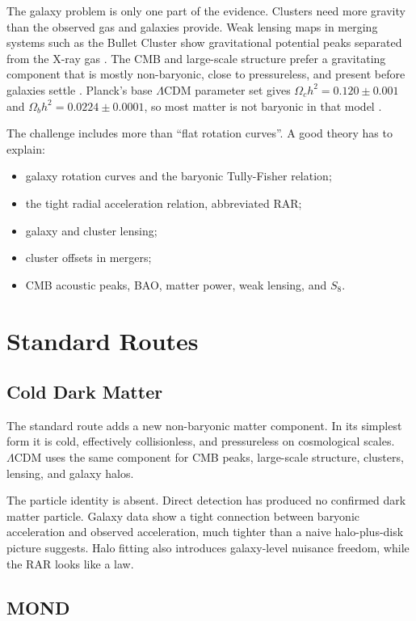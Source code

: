 \documentclass[11pt]{article}
\newcommand{\LCDM}{\Lambda\mathrm{CDM}}
\begin{document}
The galaxy problem is only one part of the evidence.  Clusters need more
gravity than the observed gas and galaxies provide.  Weak lensing maps in
merging systems such as the Bullet Cluster show gravitational potential peaks
separated from the X-ray gas \cite{clowe2006}.  The CMB and large-scale
structure prefer a gravitating component that is mostly non-baryonic, close to
pressureless, and present before galaxies settle \cite{planck2018}.  Planck's
base \(\LCDM\) parameter set gives
\(\Omega_c h^2=0.120\pm0.001\) and
\(\Omega_b h^2=0.0224\pm0.0001\), so most matter is not baryonic in that
model \cite{planck2018}.

The challenge includes more than ``flat rotation curves''.  A good theory has
to explain:
\begin{itemize}
\item galaxy rotation curves and the baryonic Tully-Fisher relation;
\item the tight radial acceleration relation, abbreviated RAR;
\item galaxy and cluster lensing;
\item cluster offsets in mergers;
\item CMB acoustic peaks, BAO, matter power, weak lensing, and \(S_8\).
\end{itemize}

\section{Standard Routes}

\subsection{Cold Dark Matter}

The standard route adds a new non-baryonic matter component.  In its simplest
form it is cold, effectively collisionless, and pressureless on cosmological
scales.  \(\LCDM\) uses the same component for CMB peaks, large-scale
structure, clusters, lensing, and galaxy halos.

The particle identity is absent.  Direct detection has produced no confirmed
dark matter particle.  Galaxy data show a tight
connection between baryonic acceleration and observed acceleration, much
tighter than a naive halo-plus-disk picture suggests.  Halo fitting also
introduces galaxy-level nuisance freedom, while the RAR looks like a law.

\subsection{MOND}
\end{document}
